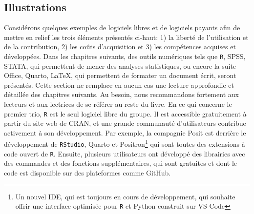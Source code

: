 \documentclass[
  letterpaper,
  DIV=11,
  numbers=noendperiod]{scrreprt}
\begin{document}
\hypertarget{illustrations}{%
\subsection{Illustrations}\label{illustrations}}

Considérons quelques exemples de logiciels libres et de logiciels
payants afin de mettre en relief les trois éléments présentés ci-haut:
1) la liberté de l'utilisation et de la contribution, 2) les coûts
d'acquisition et 3) les compétences acquises et développées. Dans les
chapitres suivants, des outils numériques tels que \texttt{R}, SPSS,
STATA, qui permettent de mener des analyses statistiques, ou encore la
suite Office, Quarto, LaTeX, qui permettent de formater un document
écrit, seront présentés. Cette section ne remplace en aucun cas une
lecture approfondie et détaillée des chapitres suivants. Au besoin, nous
recommandons fortement aux lecteurs et aux lectrices de se référer au
reste du livre. En ce qui concerne le premier trio, \texttt{R} est le
seul logiciel libre du groupe. Il est accessible gratuitement à partir
du site web de CRAN, et une grande communauté d'utilisateurs contribue
activement à son développement. Par exemple, la compagnie Posit est
derrière le développement de \texttt{RStudio}, Quarto et
Positron\footnote{Un nouvel IDE, qui est toujours en cours de
  développement, qui souhaite offrir une interface optimisée pour
  \texttt{R} et Python construit sur VS Code} qui sont toutes des
extensions à code ouvert de \texttt{R}. Ensuite, plusieurs utilisateurs
ont développé des librairies avec des commandes et des fonctions
supplémentaires, qui sont gratuites et dont le code est disponible sur
des plateformes comme GitHub.
\end{document}
